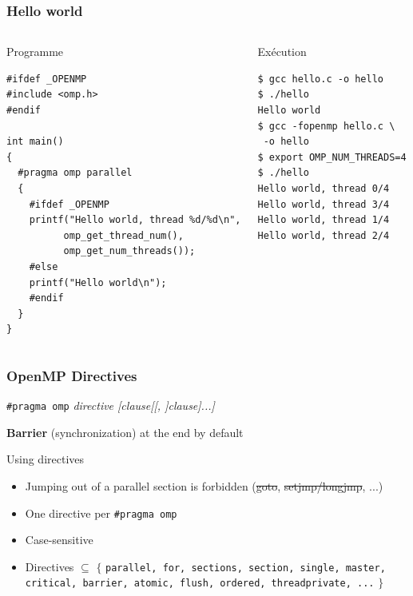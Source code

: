 \documentclass{beamer}
\begin{document}
\begin{frame}[fragile=singleslide]
  \frametitle{Hello world}

\small

\begin{columns}[t]
  \column{6cm}
  
\begin{block}{Programme}
\begin{verbatim}
#ifdef _OPENMP
#include <omp.h>
#endif

int main()
{
  #pragma omp parallel 
  {
    #ifdef _OPENMP
    printf("Hello world, thread %d/%d\n",
          omp_get_thread_num(),
          omp_get_num_threads());
    #else 
    printf("Hello world\n");    
    #endif
  }
}
\end{verbatim}
\end{block}

\column{4cm}

\begin{block}{Exécution}
\scriptsize
\begin{verbatim} 
$ gcc hello.c -o hello
$ ./hello
Hello world
$ gcc -fopenmp hello.c \
 -o hello
$ export OMP_NUM_THREADS=4
$ ./hello
Hello world, thread 0/4
Hello world, thread 3/4
Hello world, thread 1/4
Hello world, thread 2/4
\end{verbatim}
\end{block}  
\end{columns}

\end{frame}



\begin{frame}
  \frametitle{OpenMP Directives}

\begin{framed}
  {\tt \#pragma omp} {\it directive [clause[[, ]clause]...]}   
\end{framed}
 
\textbf{Barrier} (synchronization) at the end by default 

\medskip

\begin{block}{Using directives}
\begin{itemize}
\item Jumping out of a parallel section is forbidden (\sout{goto}, \sout{setjmp/longjmp}, ...)
\item One directive per \texttt{\#pragma omp}
\item Case-sensitive

\item Directives $\subseteq$ $\{$ {\tt parallel, for, sections, section, single, master, critical,
  barrier, atomic, flush, ordered, threadprivate, ...} $\}$
\end{itemize}
\end{block}

\end{frame}
\end{document}

